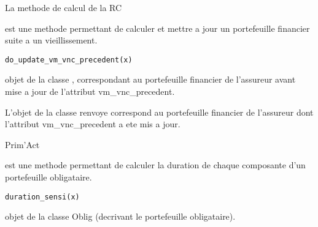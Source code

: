 \documentclass[a4paper]{book}
\begin{document}
%
\begin{SeeAlso}\relax
La methode de calcul de la RC 
\end{SeeAlso}
%
\begin{Description}\relax
{} est une methode permettant de calculer et mettre a jour un portefeuille financier
suite a un vieillissement.
\end{Description}
%
\begin{Usage}
\begin{verbatim}
do_update_vm_vnc_precedent(x)
\end{verbatim}
\end{Usage}
%
\begin{Arguments}
\begin{ldescription}
\item[\code{x}] objet de la classe , correspondant au portefeuille financier de l'assureur avant mise a jour de l'attribut vm\_vnc\_precedent.
\end{ldescription}
\end{Arguments}
%
\begin{Value}
L'objet de la classe  renvoye correspond au portefeuille financier de l'assureur dont l'attribut vm\_vnc\_precedent a ete mis a jour.
\end{Value}
%
\begin{Author}\relax
Prim'Act
\end{Author}
%
\begin{Description}\relax
{} est une methode permettant de calculer la duration de chaque composante d'un portefeuille obligataire.
\end{Description}
%
\begin{Usage}
\begin{verbatim}
duration_sensi(x)
\end{verbatim}
\end{Usage}
%
\begin{Arguments}
\begin{ldescription}
\item[\code{x}] objet de la classe Oblig (decrivant le portefeuille obligataire).
\end{ldescription}
\end{Arguments}
\end{document}
